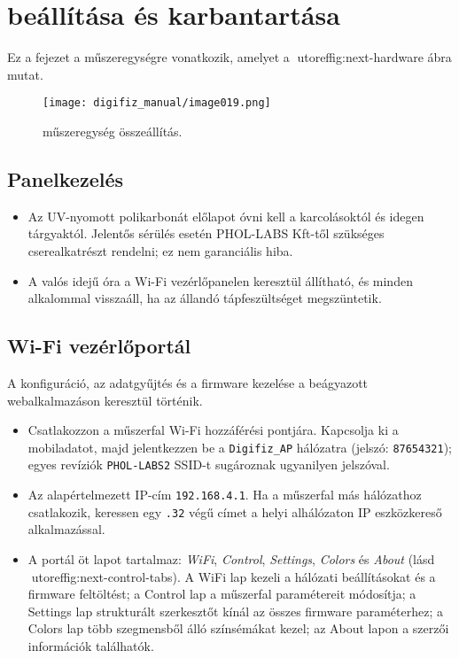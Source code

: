 \chapter{\ReplicaNextLong{} beállítása és karbantartása}\label{ch:replica-next-setup}

Ez a fejezet a \ReplicaNextLong{} műszeregységre vonatkozik, amelyet a utoref{fig:next-hardware} ábra mutat.

\begin{figure}[htbp]
    \centering
    \texttt{[image: digifiz\_manual/image019.png]}
    \caption{\ReplicaNextLong{} műszeregység összeállítás.}
    \label{fig:next-hardware}
\end{figure}

\section{Panelkezelés}
\begin{itemize}
    \item Az UV-nyomott polikarbonát előlapot óvni kell a karcolásoktól és idegen tárgyaktól. Jelentős sérülés esetén PHOL-LABS Kft-től szükséges cserealkatrészt rendelni; ez nem garanciális hiba.
    \item A valós idejű óra a Wi-Fi vezérlőpanelen keresztül állítható, és minden alkalommal visszaáll, ha az állandó tápfeszültséget megszüntetik.
\end{itemize}

\section{Wi-Fi vezérlőportál}
A konfiguráció, az adatgyűjtés és a firmware kezelése a beágyazott webalkalmazáson keresztül történik.
\begin{itemize}
    \item Csatlakozzon a műszerfal Wi-Fi hozzáférési pontjára. Kapcsolja ki a mobiladatot, majd jelentkezzen be a \texttt{Digifiz\_AP} hálózatra (jelszó: \texttt{87654321}); egyes revíziók \texttt{PHOL-LABS2} SSID-t sugároznak ugyanilyen jelszóval.
    \item Az alapértelmezett IP-cím \texttt{192.168.4.1}. Ha a műszerfal más hálózathoz csatlakozik, keressen egy \texttt{.32} végű címet a helyi alhálózaton IP eszközkereső alkalmazással.
    \item A portál öt lapot tartalmaz: \emph{WiFi}, \emph{Control}, \emph{Settings}, \emph{Colors} és \emph{About} (lásd utoref{fig:next-control-tabs}). A WiFi lap kezeli a hálózati beállításokat és a firmware feltöltést; a Control lap a műszerfal paramétereit módosítja; a Settings lap strukturált szerkesztőt kínál az összes firmware paraméterhez; a Colors lap több szegmensből álló színsémákat kezel; az About lapon a szerzői információk találhatók.
\end{itemize}

